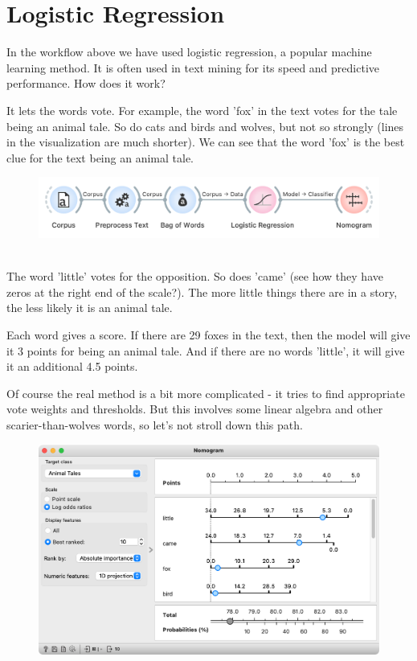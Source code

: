 \chapter{Logistic Regression}

In the workflow above we have used logistic regression, a popular machine learning method. It is often used in text mining for its speed and predictive performance. How does it work?

It lets the words vote. For example, the word 'fox' in the text votes for the tale being an animal tale. So do cats and birds and wolves, but not so strongly (lines in the visualization are much shorter). We can see that the word 'fox' is the best clue for the text being an animal tale.

\vspace{-0.2cm}
\begin{figure}[h]
  \centering
  \includegraphics[width=0.8\linewidth]{workflow.png}%
  \caption{$\;$}
\end{figure}
\vspace{-0.3cm}

The word 'little' votes for the opposition. So does 'came' (see how they have zeros at the right end of the scale?). The more little things there are in a story, the less likely it is an animal tale.

Each word gives a score. If there are 29 foxes in the text, then the model will give it 3 points for being an animal tale. And if there are no words 'little', it will give it an additional 4.5 points.

Of course the real method is a bit more complicated - it tries to find appropriate vote weights and thresholds. But this involves some linear algebra and other scarier-than-wolves words, so let's not stroll down this path.

\vspace{-0.2cm}
\begin{figure}[h]
  \centering
  \includegraphics[width=0.8\linewidth]{nomogram.png}%
  \caption{$\;$}
\end{figure}
\vspace{-0.3cm}
